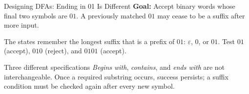 \documentclass[10pt]{beamer}
\begin{document}
\begin{frame}{Designing DFAs: Ending in 01 Is Different}
  \small
  \textbf{Goal:} Accept binary words whose final two symbols are $01$.
  A previously matched $01$ may cease to be a suffix after more input.
  \begin{center}
  \end{center}
  \pause
  The states remember the longest suffix that is a prefix of $01$:
  $\varepsilon$, $0$, or $01$. Test $01$ (accept), $010$ (reject), and
  $0101$ (accept).
  \begin{alertblock}{Three different specifications}
    \emph{Begins with}, \emph{contains}, and \emph{ends with} are not
    interchangeable. Once a required substring occurs, success persists;
    a suffix condition must be checked again after every new symbol.
  \end{alertblock}
\end{frame}
\end{document}
